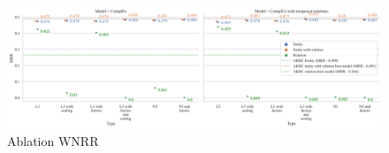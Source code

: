 \begin{figure}[!htbp]
	\begin{center}
	\includegraphics[width=\linewidth]{Images/Ablation_WNRR.png}
	\caption[Ablation WNRR]{Ablation WNRR}
	\label{fig:Ablation WNRR}
	\end{center}
\end{figure}